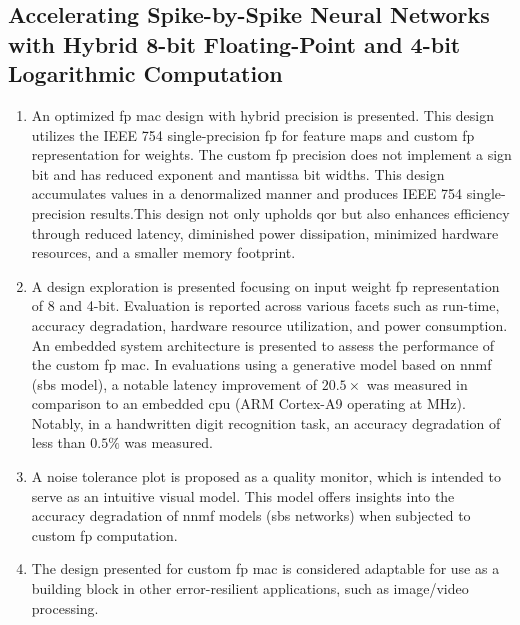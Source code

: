 \subsection{Accelerating Spike-by-Spike Neural Networks with Hybrid 8-bit Floating-Point and 4-bit Logarithmic Computation}
\begin{enumerate}
	\item An optimized \gls{fp} \gls{mac} design with hybrid precision is presented. This design utilizes the IEEE 754 single-precision \gls{fp} for feature maps and custom \gls{fp} representation for weights. The custom \gls{fp} precision does not implement a sign bit and has reduced exponent and mantissa bit widths. This design accumulates values in a denormalized manner and produces IEEE 754 single-precision results.This design not only upholds \gls{qor} but also enhances efficiency through reduced latency, diminished power dissipation, minimized hardware resources, and a smaller memory footprint.
	\item A design exploration is presented focusing on input weight \gls{fp} representation of 8 and 4-bit. Evaluation is reported across various facets such as run-time, accuracy degradation, hardware resource utilization, and power consumption. An embedded system architecture is presented to assess the performance of the custom \gls{fp} \gls{mac}. In evaluations using a generative model based on \gls{nnmf} (\gls{sbs} model), a notable latency improvement of $20.5\times$ was measured in comparison to an embedded \gls{cpu} (ARM Cortex-A9 operating at \unit[666]{MHz}). Notably, in a handwritten digit recognition task, an accuracy degradation of less than $0.5\%$ was measured.
	\item A noise tolerance plot is proposed as a quality monitor, which is intended to serve as an intuitive visual model. This model offers insights into the accuracy degradation of \gls{nnmf} models (\gls{sbs} networks) when subjected to custom \gls{fp} computation.
	\item The design presented for custom \gls{fp} \gls{mac} is considered adaptable for use as a building block in other error-resilient applications, such as image/video processing.
\end{enumerate}


